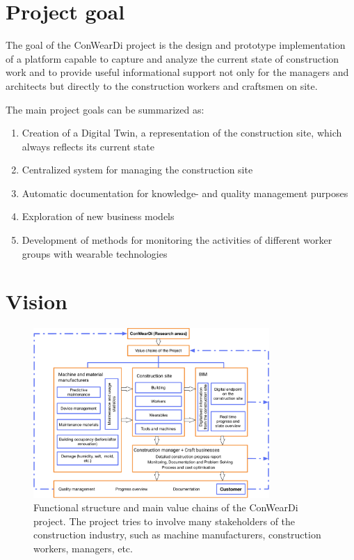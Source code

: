 \section{Project goal}
The goal of the ConWearDi project is the design and prototype implementation of a platform capable to capture and analyze the current state of construction work and to provide useful informational support not only for the managers and architects but directly to the construction workers and craftsmen on site. 


The main project goals can be summarized as:
\begin{enumerate}
  \item Creation of a Digital Twin, a representation of the construction site, which always reflects its current state 
  \item Centralized system for managing the construction site
  \item Automatic documentation for knowledge- and quality management purposes
  \item Exploration of new business models
  \item Development of methods for monitoring the activities of different worker groups with wearable technologies
\end{enumerate}

\section{Vision}

\begin{figure}[htp]
\includegraphics[width=0.8\textwidth]{figures/conweardi-functional.pdf}
\caption{Functional structure and main value chains of the ConWearDi project. The project tries to involve many stakeholders of the construction industry, such as machine manufacturers, construction workers, managers, etc. }
\label{fig:functional}
\end{figure}


